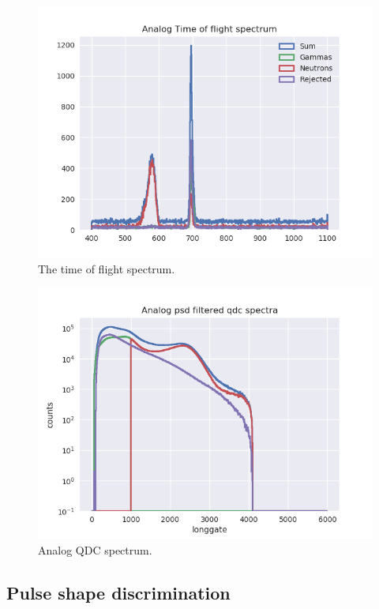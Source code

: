 \documentclass[main.tex]{subfiles}
\begin{document}
\begin{figure}[ht]
    \centering
        \includegraphics[scale=.75]{AnalogResults/tof_psd.png}
        \caption{The time of flight spectrum.}
    \label{fig:A_TOF}
\end{figure}
\begin{figure}[ht]
    \centering
        \includegraphics[scale=.75]{AnalogResults/qdc_psd.png}
        \caption{Analog QDC spectrum.}
    \label{fig:qdc_a}
\end{figure}


\subsection{Pulse shape discrimination}
\end{document}
